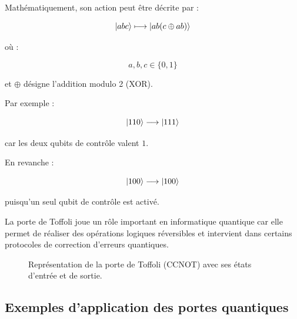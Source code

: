 \documentclass[a4paper,12pt]{article}
\begin{document}
Mathématiquement, son action peut être décrite par :

\[
\ket{abc}
\longmapsto
\ket{ab(c \oplus ab)}
\]

où :

\[
a,b,c\in\{0,1\}
\]

et $\oplus$ désigne l’addition modulo 2 (XOR).

Par exemple :

\[
\ket{110}
\longrightarrow
\ket{111}
\]

car les deux qubits de contrôle valent $1$.

En revanche :

\[
\ket{100}
\longrightarrow
\ket{100}
\]

puisqu’un seul qubit de contrôle est activé.

La porte de Toffoli joue un rôle important en informatique quantique car elle permet de réaliser des opérations logiques réversibles et intervient dans certains protocoles de correction d’erreurs quantiques.

\begin{figure}[H]
\centering
{}
\caption{Représentation de la porte de Toffoli (CCNOT) avec ses états d'entrée et de sortie.}
\label{fig:toffoli}
\end{figure}

\subsection{Exemples d’application des portes quantiques}
\end{document}
